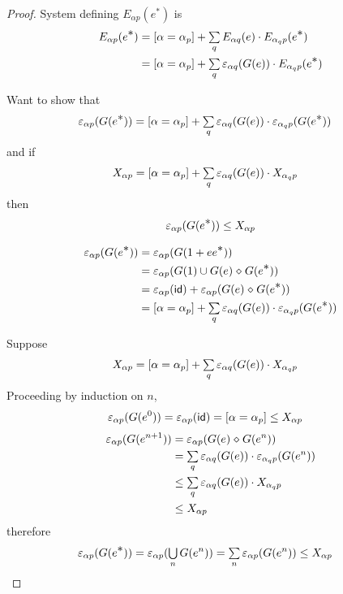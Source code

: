 \documentclass{article}
\renewcommand\smash{\mathrel{\diamond}}
\newcommand\ssum{\mathop{\textstyle\sum}}
\newcommand\bval[1]{[#1]}
\renewcommand\star{^{\textstyle *}}
\newcommand\id{\mathsf{id}}
\newcommand\sbigcup{\mathop{\textstyle\bigcup}}
\begin{document}
\begin{proof}
System defining $E_{\alpha p}(e\star)$ is
\begin{align*}
E_{\alpha p}(e\star)
&= \bval{\alpha=\alpha_p} + \ssum_{q} E_{\alpha q}(e)\cdot E_{\alpha_q p}(e\star)\\
&= \bval{\alpha=\alpha_p} + \ssum_{q} \eps_{\alpha q}(G(e))\cdot E_{\alpha_q p}(e\star)
\end{align*}

Want to show that
\begin{align*}
\eps_{\alpha p}(G(e\star))
&= \bval{\alpha=\alpha_p} + \ssum_{q} \eps_{\alpha q}(G(e))\cdot \eps_{\alpha_q p}(G(e\star))
\end{align*}
and if
\begin{align*}
X_{\alpha p}
&= \bval{\alpha=\alpha_p} + \ssum_{q} \eps_{\alpha q}(G(e))\cdot X_{\alpha_q p}
\end{align*}
then
\begin{align*}
\eps_{\alpha p}(G(e\star)) \leq X_{\alpha p}
\end{align*}

\begin{align*}
\eps_{\alpha p}(G(e\star))
&= \eps_{\alpha p}(G(1 + ee\star))\\
&= \eps_{\alpha p}(G(1)\cup G(e)\smash G(e\star))\\
&= \eps_{\alpha p}(\id) + \eps_{\alpha p}(G(e)\smash G(e\star))\\
&= \bval{\alpha=\alpha_p} + \ssum_{q} \eps_{\alpha q}(G(e))\cdot \eps_{\alpha_q p}(G(e\star))
\end{align*}

Suppose
\begin{align*}
X_{\alpha p}
&= \bval{\alpha=\alpha_p} + \ssum_{q} \eps_{\alpha q}(G(e))\cdot X_{\alpha_q p}
\end{align*}
Proceeding by induction on $n$,
\begin{align*}
\eps_{\alpha p}(G(e^0))
&= \eps_{\alpha p}(\id)
= \bval{\alpha=\alpha_p}
\leq X_{\alpha p}
\end{align*}
\begin{align*}
\eps_{\alpha p}(G(e^{n+1}))
&= \eps_{\alpha p}(G(e)\smash G(e^n))\\
&= \ssum_q \eps_{\alpha q}(G(e))\cdot\eps_{\alpha_q p}(G(e^n))\\
&\leq \ssum_q \eps_{\alpha q}(G(e))\cdot X_{\alpha_q p}\\
&\leq X_{\alpha p}
\end{align*}
therefore
\begin{align*}
\eps_{\alpha p}(G(e\star))
&= \eps_{\alpha p}(\sbigcup_n G(e^n))
= \ssum_n\eps_{\alpha p}(G(e^n))
\leq X_{\alpha p}
\end{align*}
\end{proof}
\end{document}
